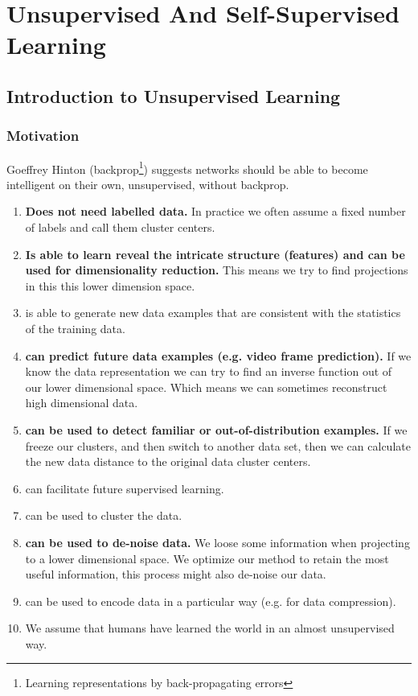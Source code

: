 \documentclass[main]{subfiles}
\begin{document}
\newpage
\section{Unsupervised And Self-Supervised Learning}


\subsection{Introduction to Unsupervised Learning}
\subsubsection{Motivation}

Goeffrey Hinton (backprop\footnote{Learning representations by back-propagating errors}) suggests networks should be able to become intelligent on their own, unsupervised, without backprop.

\begin{enumerate}
    \item \textbf{Does not need labelled data.} In practice we often assume a fixed number of labels and call them cluster centers.
    \item \textbf {Is able to learn reveal the intricate structure (features) and can be used for dimensionality reduction.} This means we try to find projections in this this lower dimension space.
    \item is able to generate new data examples that are consistent with the statistics of the training data.
    \item \textbf {can predict future data examples (e.g. video frame prediction).} If we know the data representation we can try to find an inverse function out of our lower dimensional space. Which means we can sometimes reconstruct high dimensional data.
    \item \textbf {can be used to detect familiar or out-of-distribution examples.} If we freeze our clusters, and then switch to another data set, then we can calculate the new data distance to the original data cluster centers.
    \item can facilitate future supervised learning.
    \item can be used to cluster the data.
    \item \textbf{can be used to de-noise data.} We loose some information when projecting to a lower dimensional space. We optimize our method to retain the most useful information, this process might also de-noise our data.
    \item can be used to encode data in a particular way (e.g. for data compression).
    \item We assume that humans have learned the world in an almost unsupervised way. 
\end{enumerate}
\end{document}
